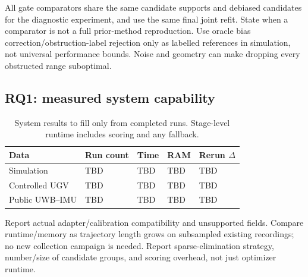 \documentclass[conference]{IEEEtran}%
\begin{document}
All gate comparators share the same candidate supports and debiased candidates for the diagnostic experiment, and use the same final joint refit. State when a comparator is not a full prior-method reproduction. Use oracle bias correction/obstruction-label rejection only as labelled references in simulation, not universal performance bounds. Noise and geometry can make dropping every obstructed range suboptimal.

\subsection{RQ1: measured system capability}
\begin{table}[t]
\centering\small
\caption{System results to fill only from completed runs. Stage-level runtime includes scoring and any fallback.}
\label{tab:system_results}
\begin{tabularx}{\columnwidth}{@{}lXXXX@{}}
\toprule
Data & Run count & Time & RAM & Rerun $\Delta$\\
\midrule
Simulation & TBD & TBD & TBD & TBD\\
Controlled UGV & TBD & TBD & TBD & TBD\\
Public UWB--IMU & TBD & TBD & TBD & TBD\\
\bottomrule
\end{tabularx}
\end{table}
Report actual adapter/calibration compatibility and unsupported fields. Compare runtime/memory as trajectory length grows on subsampled existing recordings; no new collection campaign is needed. Report sparse-elimination strategy, number/size of candidate groups, and scoring overhead, not just optimizer runtime.
\end{document}
